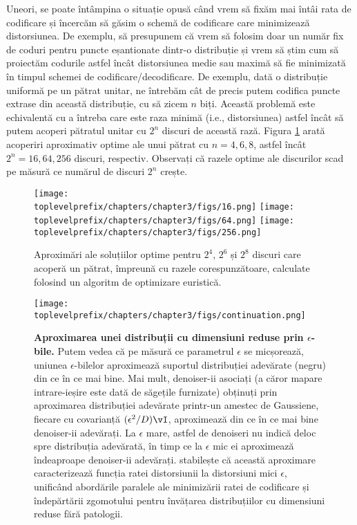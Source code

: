 \documentclass[../../book-main_ro.tex]{subfiles}
\begin{document}
\begin{example}\label{example:sphere-covering-rate-distortion}
	Uneori, se poate întâmpina o situație opusă când vrem să fixăm mai întâi rata de codificare și încercăm să găsim o schemă de codificare care minimizează distorsiunea. De exemplu, să presupunem că vrem să folosim doar un număr fix de coduri pentru puncte eșantionate dintr-o distribuție și vrem să știm cum să proiectăm codurile astfel încât distorsiunea medie sau maximă să fie minimizată în timpul schemei de codificare/decodificare. De exemplu, dată o distribuție uniformă pe un pătrat unitar, ne întrebăm cât de precis putem codifica puncte extrase din această distribuție, cu să zicem $n$ biți. Această problemă este echivalentă cu a întreba care este raza minimă (i.e., distorsiunea) astfel încât să putem acoperi pătratul unitar cu $2^n$ discuri de această rază. Figura \ref{fig:seven-circles-packing} arată acoperiri aproximativ optime ale unui pătrat cu \(n = 4, 6, 8\), astfel încât \(2^{n} = 16, 64, 256\) discuri, respectiv. Observați că razele optime ale discurilor scad pe măsură ce numărul de discuri \(2^{n}\) crește.
	\begin{figure}
		\centering
		\texttt{[image: \\toplevelprefix/chapters/chapter3/figs/16.png]}
		\hfill
		\texttt{[image: \\toplevelprefix/chapters/chapter3/figs/64.png]}
		\hfill
		\texttt{[image: \\toplevelprefix/chapters/chapter3/figs/256.png]}

		\caption{Aproximări ale soluțiilor optime pentru \(2^{4}\), \(2^{6}\) și \(2^{8}\) discuri care acoperă un pătrat, împreună cu razele corespunzătoare, calculate folosind un algoritm de optimizare euristică.}
		\label{fig:seven-circles-packing}
	\end{figure}
\end{example}

\begin{figure}[t]
	\centering 
	\texttt{[image: \\toplevelprefix/chapters/chapter3/figs/continuation.png]}
	\caption{\small\textbf{Aproximarea unei distribuții cu dimensiuni reduse prin \(\epsilon\)-bile.} Putem vedea că pe măsură ce parametrul \(\epsilon\) se micșorează, uniunea \(\epsilon\)-bilelor aproximează suportul distribuției adevărate (negru) din ce în ce mai bine. Mai mult, denoiser-ii asociați (a căror mapare intrare-ieșire este dată de săgețile furnizate) obținuți prin aproximarea distribuției adevărate printr-un amestec de Gaussiene, fiecare cu covarianță \((\epsilon^{2}/D)\vI\), aproximează din ce în ce mai bine denoiser-ii adevărați. La \(\epsilon\) mare, astfel de denoiseri nu indică deloc spre distribuția adevărată, în timp ce la \(\epsilon\) mic ei aproximează îndeaproape denoiser-ii adevărați.  stabilește că această aproximare caracterizează funcția ratei distorsiunii la distorsiuni mici $\epsilon$, unificând abordările paralele ale minimizării ratei de codificare și îndepărtării zgomotului pentru învățarea distribuțiilor cu dimensiuni reduse fără patologii.}
	\label{fig:continuation}
\end{figure}
\end{document}
